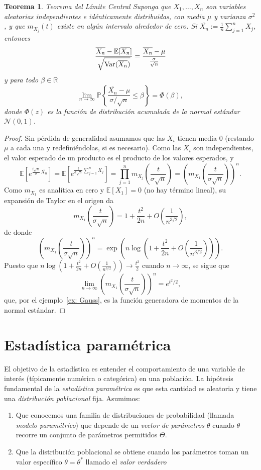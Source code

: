 \documentclass[12pt]{amsart}
\newtheorem{theorem}[lemma]{Teorema}
\theoremstyle{definition}
\renewcommand{\leq}{\leqslant}
\newcommand{\PP}{\ensuremath{\mathbb{P}}}
\newcommand{\RR}{\ensuremath{\mathbb{R}}}
\newcommand{\EE}{\ensuremath{\mathbb{E}}}
\begin{document}
\begin{theorem} {\it Teorema del Límite Central} Suponga que $X_1,\dots, X_n$ son variables aleatorias
independientes e idénticamente distribuidas, con media $\mu$ y varianza $\sigma^2$, y que
$m_{X_j}(t)$ existe en algún intervalo alrededor de cero. Si $\overline{X_n}:=\frac{1}{n}\sum_{j=1}^n X_j$,
entonces 
\[\frac{\overline{X_n}-\EE[\overline{X_n}]}{\sqrt{{\rm Var}(\overline{X_n})}} = \frac{\overline{X_n}-\mu}{\frac{\sigma}{\sqrt{n}}}\]
y para todo $\beta\in \RR$
\[\lim_{n\rightarrow \infty}\PP\left\{ \frac{\overline{X_n}-\mu}{\sigma/\sqrt{n}}\leq \beta\right\}=\Phi(\beta),
\]
donde $\Phi(z)$ es la función de distribución acumulada de la normal estándar $\mathcal{N}(0,1)$.
\end{theorem}
\begin{proof} Sin pérdida de generalidad asumamos que las $X_i$ tienen media $0$ (restando $\mu$ a cada una y redefiniéndolas, si es necesario). Como las $X_i$ son independientes, el valor esperado de un producto es el producto de los
valores esperados, y
\[\EE\left[e^{\frac{t\sqrt{n}}{\sigma}\,\overline{X_n}}\right]
 =\EE\left[e^{\frac{t}{\sigma\sqrt{n}}\sum_{j=1}^n X_j}\right]
 =\prod_{j=1}^n m_{X_j}\left(\frac{t}{\sigma\sqrt{n}}\right)
 =\left(m_{X_1}\left(\frac{t}{\sigma\sqrt{n}}\right)\right)^{n}.
\]
Como $m_{X_1}$ es analítica en cero y $\EE[X_1]=0$ (no hay término lineal), su expansión de Taylor en el
origen da
\[
m_{X_1}\left(\frac{t}{\sigma\sqrt{n}}\right)=1+\frac{t^2}{2n}+O\!\left(\frac{1}{n^{3/2}}\right),
\]
de donde
\[
\left(m_{X_1}\left(\frac{t}{\sigma\sqrt{n}}\right)\right)^n
=\exp\!\left(n\log\left(1+\frac{t^2}{2n}+O\!\left(\frac{1}{n^{3/2}}\right)\right)\right).
\]
Puesto que $n\log\left(1+\frac{t^2}{2n}+O\!\left(\frac{1}{n^{3/2}}\right)\right)\to \frac{t^2}{2}$ cuando
$n\to\infty$, se sigue que
\[
\lim_{n\to\infty}\left(m_{X_1}\left(\frac{t}{\sigma\sqrt{n}}\right)\right)^n = e^{t^2/2},
\]
que, por el ejemplo~\ref{ex: Gauss}, es la función generadora de momentos de la normal estándar.
\end{proof}

\section{Estadística paramétrica}

El objetivo de la estadística es entender el comportamiento de una variable de interés (típicamente numérica o categórica) en una población.
La hipótesis fundamental de la \emph{estadística paramétrica} es que esta cantidad es aleatoria y tiene una \emph{distribución poblacional} fija. 
Asumimos:
\begin{enumerate}
    \item Que conocemos una familia de distribuciones de probabilidad (llamada \emph{modelo paramétrico}) que depende de un \emph{vector de parámetros $\theta$} cuando $\theta$ recorre un conjunto de parámetros permitidos $\Theta$. 
\item Que la distribución poblacional se obtiene cuando los parámetros toman un valor específico  $\theta=\theta^*$ llamado el \emph{valor verdadero}
\end{enumerate}
\end{document}
